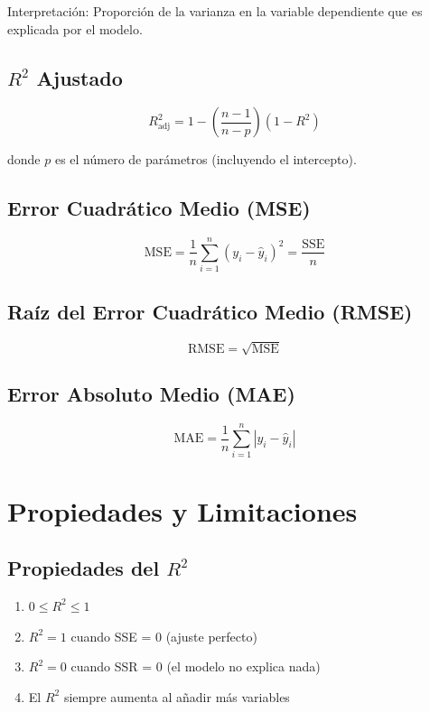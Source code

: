 \documentclass[12pt]{article}
\begin{document}
Interpretación: Proporción de la varianza en la variable dependiente que es explicada por el modelo.

\subsection{$R^2$ Ajustado}

\[
R^2_{\text{adj}} = 1 - \left(\frac{n-1}{n-p}\right)(1 - R^2)
\]

donde $p$ es el número de parámetros (incluyendo el intercepto).


\subsection{Error Cuadrático Medio (MSE)}

\[
\text{MSE} = \frac{1}{n}\sum_{i=1}^{n}(y_i - \hat{y}_i)^2 = \frac{\text{SSE}}{n}
\]

\subsection{Raíz del Error Cuadrático Medio (RMSE)}

\[
\text{RMSE} = \sqrt{\text{MSE}}
\]

\subsection{Error Absoluto Medio (MAE)}

\[
\text{MAE} = \frac{1}{n}\sum_{i=1}^{n}|y_i - \hat{y}_i|
\]

\section{Propiedades y Limitaciones}

\subsection{Propiedades del $R^2$}

\begin{enumerate}
\item $0 \leq R^2 \leq 1$
\item $R^2 = 1$ cuando SSE = 0 (ajuste perfecto)
\item $R^2 = 0$ cuando SSR = 0 (el modelo no explica nada)
\item El $R^2$ siempre aumenta al añadir más variables
\end{enumerate}
\end{document}
